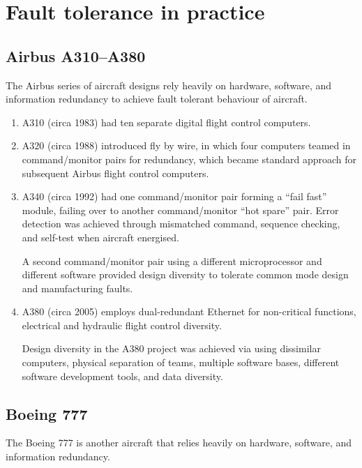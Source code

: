 \section{Fault tolerance in practice}

\subsection{Airbus A310--A380}

The Airbus series of aircraft designs rely heavily on hardware, software, and information redundancy to achieve fault tolerant behaviour of aircraft. 

\begin{enumerate}

 \item A310 (circa 1983) had ten separate digital flight control computers.

 \item A320 (circa 1988) introduced fly by wire, in which four computers teamed in command/monitor pairs for redundancy, which became standard approach for subsequent Airbus flight control computers.

 \item A340 (circa 1992) had one command/monitor pair forming a ``fail fast'' module, failing over to another command/monitor ``hot spare'' pair.  Error detection was achieved through mismatched command, sequence checking, and self-test when aircraft energised.

 A second command/monitor pair using a different microprocessor and different software provided design diversity to tolerate common mode design and manufacturing faults.

 \item A380 (circa 2005) employs dual-redundant Ethernet for non-critical functions, electrical and hydraulic flight control diversity.

 Design diversity in the A380 project was achieved via using dissimilar computers, physical separation of teams, multiple software bases, different software development tools, and data diversity.

\end{enumerate}


\subsection{Boeing 777}

The Boeing 777 is another aircraft that relies heavily on hardware, software, and information redundancy.

